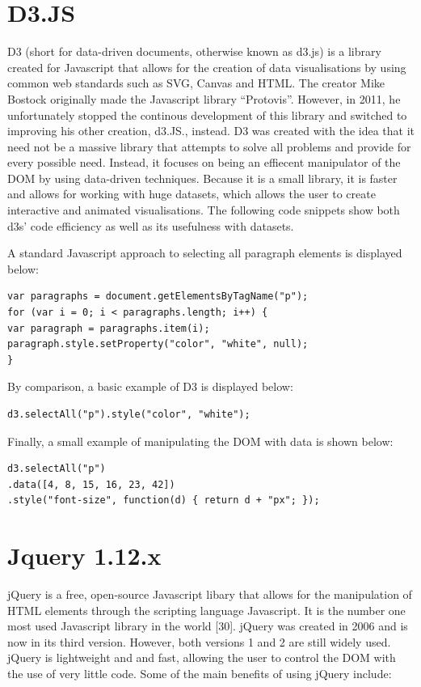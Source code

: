 \section{D3.JS}
D3 (short for data-driven documents, otherwise known as d3.js) is a library created for Javascript that allows for the creation of data visualisations by using common web standards such as SVG, Canvas and HTML. The creator Mike Bostock originally made the Javascript library “Protovis”. 
However, in 2011, he unfortunately stopped the continous development of this library and switched to improving his other creation, d3.JS., instead. D3 was created with the idea that it need not be a massive library that attempts to solve all problems and provide for every possible need. Instead, it  focuses on being an effiecent manipulator of the DOM by using data-driven techniques. Because it is a small library, it is faster and allows for working with huge datasets, which allows the user to create interactive and animated visualisations.  The following code snippets show both d3s’ code efficiency as well as its usefulness with datasets. 

A standard Javascript approach to selecting all paragraph elements is displayed below:
\begin{verbatim}
var paragraphs = document.getElementsByTagName("p");
for (var i = 0; i < paragraphs.length; i++) {
var paragraph = paragraphs.item(i);
paragraph.style.setProperty("color", "white", null);
}
\end{verbatim}
By comparison, a basic example of D3 is displayed below: 
\begin{verbatim}
d3.selectAll("p").style("color", "white");
\end{verbatim}
Finally, a small example of manipulating the DOM with data is shown below:
\begin{verbatim}
d3.selectAll("p")
.data([4, 8, 15, 16, 23, 42])
.style("font-size", function(d) { return d + "px"; });
\end{verbatim}
\section{Jquery 1.12.x}
jQuery is a free, open-source Javascript libary that allows for the manipulation of HTML elements through the scripting language Javascript. It is the number one most used Javascript library in the world [30]. jQuery was created in 2006 and is now in its third version. However, both versions 1 and 2 are still widely used. jQuery is lightweight and and fast, allowing the user to control the DOM with the use of very little code. Some of the main benefits of using jQuery include:

